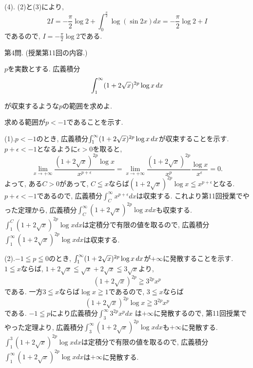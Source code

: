 \documentclass[dvipdfmx,a4paper,11pt]{article}
\theoremstyle{definition}
\begin{document}
(4). (2)と(3)により,
$$
2I =-\frac{\pi}{2} \log2 + \int_{0}^{\frac{\pi}{2}} \log (\sin 2x) dx 
=-\frac{\pi}{2} \log2 + I
$$
であるので, $I = -\frac{\pi}{2} \log2$である.
\vspace{33pt} 
     
   
{\Large 第4問.} (授業第11回の内容.)
\vspace{11pt}

$p$を実数とする.
 広義積分
$$\int_{1}^{\infty} (1+2\sqrt{x})^{2p} \log x \text{\,}dx $$

が収束するような$p$の範囲を求めよ.

  \vspace{11pt}
 
\hspace{-11pt}{\Large $\bullet$ 第4問解答例.}

求める範囲が$p<-1$であることを示す. 

(1).$p < -1$のとき, 広義積分$\int_{1}^{\infty} (1+2\sqrt{x})^{2p} \log x \text{\,}dx$が収束することを示す. \\
$p + \epsilon <-1$となるように$\epsilon >0$を取ると, 
$$
\lim_{x \rightarrow + \infty} \frac{(1 + 2 \sqrt{x})^{2p} \log x}{ x^{p+ \epsilon} }
= 
\lim_{x \rightarrow + \infty}\frac{(1 + 2 \sqrt{x})^{2p}} { x^p }\frac{\log x}{ x^{\epsilon}}
= 0.
$$
よって, ある$C>0$があって, $C \leqq x$ならば$(1 + 2 \sqrt{x})^{2p} \log x \leqq x^{p+ \epsilon} $となる.
$p + \epsilon <-1$であるので, 広義積分$\int_{C}^{\infty} x^{p + \epsilon} dx$は収束する.
これより第11回授業でやった定理から, 広義積分$\int_{C}^{\infty}(1 + 2 \sqrt{x})^{2p} \log x dx$も収束する.
$\int^{C}_{1}(1 + 2 \sqrt{x})^{2p} \log x dx$は定積分で有限の値を取るので, 広義積分
$\int_{1}^{\infty} (1 + 2 \sqrt{x})^{2p} \log x dx$は収束する.

(2).$-1 \leqq p \leqq 0$のとき, $\int_{1}^{\infty} (1+2\sqrt{x})^{2p} \log x \text{\,}dx$が$+ \infty$に発散することを示す. \\
$1 \leqq x$ならば, $1 + 2 \sqrt{x} \leqq \sqrt{x} + 2 \sqrt{x} \leqq 3\sqrt{x} $より, 
$$
(1 + 2 \sqrt{x})^{2p} \geqq 3^{2p} x^{p}
$$
である. 一方$3 \leqq x$ならば$\log x \geqq 1$であるので, 
$3 \leqq x$ならば
$$
(1 + 2 \sqrt{x})^{2p} \log x \geqq 3^{2p} x^{p}
$$
である. $-1 \leqq p$により広義積分$\int_{3}^{\infty} 3^{2p} x^{p} dx$ は$+ \infty$に発散するので, 
第11回授業でやった定理より, 広義積分$\int_{3}^{\infty} (1 + 2 \sqrt{x})^{2p} \log x dx$も$+ \infty$に発散する.
$\int_{1}^{3} (1 + 2 \sqrt{x})^{2p} \log x dx$は定積分で有限の値を取るので, 広義積分
$\int_{1}^{\infty} (1 + 2 \sqrt{x})^{2p} \log x dx$は$+ \infty$に発散する.
\end{document}
